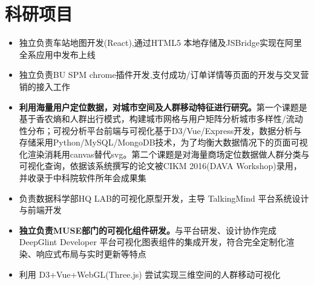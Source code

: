 \documentclass{resume}
\begin{document}

\section{科研项目}
\begin{itemize}
  \item 独立负责车站地图开发(React),通过HTML5 本地存储及JSBridge实现在阿里全系应用中发布上线
  \item 独立负责BU SPM chrome插件开发,支付成功/订单详情等页面的开发与交叉营销的接入工作
\end{itemize}

\begin{itemize}
  \item \textbf{利用海量用户定位数据，对城市空间及人群移动特征进行研究。}第一个课题是基于香农熵和人群出行模式，构建城市网格与用户矩阵分析城市多样性/流动性分布；可视分析平台前端与可视化基于D3/Vue/Express开发，数据分析与存储采用Python/MySQL/MongoDB技术，为了均衡大数据情况下的页面可视化渲染消耗用canvas替代svg。第二个课题是对海量商场定位数据做人群分类与可视化查询，依据该系统撰写的论文被CIKM 2016(DAVA Workshop)录用，并收录于中科院软件所年会成果集
  \item 负责数据科学部HQ LAB的可视化原型开发，主导 TalkingMind 平台系统设计与前端开发
\end{itemize}

\begin{itemize}
  \item \textbf{独立负责MUSE部门的可视化组件研发。}与平台研发、设计协作完成 DeepGlint Developer 平台可视化图表组件的集成开发，符合完全定制化渲染、响应式布局与实时更新等特点
  \item 利用 D3+Vue+WebGL(Three.js) 尝试实现三维空间的人群移动可视化
\end{itemize}


\end{document}
